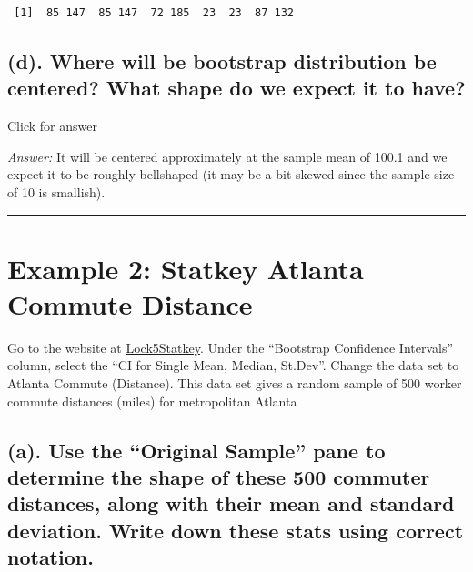 \documentclass[
]{book}
\begin{document}
\begin{verbatim}
 [1]  85 147  85 147  72 185  23  23  87 132
\end{verbatim}

\hypertarget{d.-where-will-be-bootstrap-distribution-be-centered-what-shape-do-we-expect-it-to-have}{%
\subsection{(d). Where will be bootstrap distribution be centered? What shape do we expect it to have?}\label{d.-where-will-be-bootstrap-distribution-be-centered-what-shape-do-we-expect-it-to-have}}

Click for answer

\emph{Answer:} It will be centered approximately at the sample mean of 100.1 and we expect it to be roughly bellshaped (it may be a bit skewed since the sample size of 10 is smallish).

\begin{center}\rule{0.5\linewidth}{0.5pt}\end{center}

\hypertarget{example-2-statkey-atlanta-commute-distance}{%
\section{Example 2: Statkey Atlanta Commute Distance}\label{example-2-statkey-atlanta-commute-distance}}

Go to the website at \href{http://www.lock5stat.com/StatKey/}{Lock5Statkey}. Under the ``Bootstrap Confidence Intervals'' column, select the ``CI for Single Mean, Median, St.Dev''. Change the data set to Atlanta Commute (Distance). This data set gives a random sample of 500 worker commute distances (miles) for metropolitan Atlanta

\hypertarget{a.-use-the-original-sample-pane-to-determine-the-shape-of-these-500-commuter-distances-along-with-their-mean-and-standard-deviation.-write-down-these-stats-using-correct-notation.}{%
\subsection{(a). Use the ``Original Sample'' pane to determine the shape of these 500 commuter distances, along with their mean and standard deviation. Write down these stats using correct notation.}\label{a.-use-the-original-sample-pane-to-determine-the-shape-of-these-500-commuter-distances-along-with-their-mean-and-standard-deviation.-write-down-these-stats-using-correct-notation.}}
\end{document}
